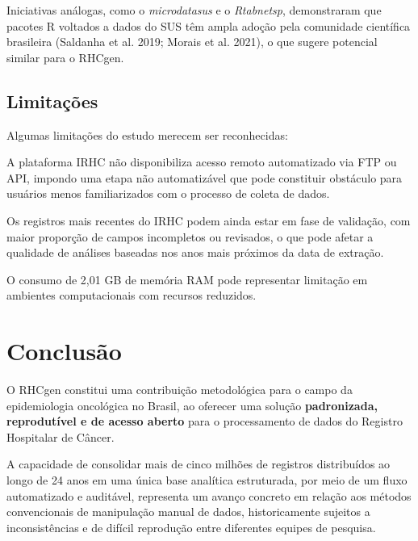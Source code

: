 \documentclass[
  brazilian,
  a4paper,
  oneside]{scrbook}
\providecommand{\tightlist}{%
  \setlength{\itemsep}{0pt}\setlength{\parskip}{0pt}}
\begin{document}
Iniciativas análogas, como o \emph{microdatasus} e o \emph{Rtabnetsp},
demonstraram que pacotes R voltados a dados do SUS têm ampla adoção pela
comunidade científica brasileira (Saldanha et al. 2019; Morais et al.
2021), o que sugere potencial similar para o RHCgen.

\section{Limitações}\label{limitauxe7uxf5es}

Algumas limitações do estudo merecem ser reconhecidas:

\begin{description}
\tightlist
\item[\textbf{Download manual dos arquivos}]
A plataforma IRHC não disponibiliza acesso remoto automatizado via FTP
ou API, impondo uma etapa não automatizável que pode constituir
obstáculo para usuários menos familiarizados com o processo de coleta de
dados.
\item[\textbf{Dados recentes em fase de validação}]
Os registros mais recentes do IRHC podem ainda estar em fase de
validação, com maior proporção de campos incompletos ou revisados, o que
pode afetar a qualidade de análises baseadas nos anos mais próximos da
data de extração.
\item[\textbf{Requisitos de memória}]
O consumo de 2,01 GB de memória RAM pode representar limitação em
ambientes computacionais com recursos reduzidos.
\end{description}


\chapter{Conclusão}\label{conclusuxe3o}

O RHCgen constitui uma contribuição metodológica para o campo da
epidemiologia oncológica no Brasil, ao oferecer uma solução
\textbf{padronizada, reprodutível e de acesso aberto} para o
processamento de dados do Registro Hospitalar de Câncer.

A capacidade de consolidar mais de cinco milhões de registros
distribuídos ao longo de 24 anos em uma única base analítica
estruturada, por meio de um fluxo automatizado e auditável, representa
um avanço concreto em relação aos métodos convencionais de manipulação
manual de dados, historicamente sujeitos a inconsistências e de difícil
reprodução entre diferentes equipes de pesquisa.
\end{document}
